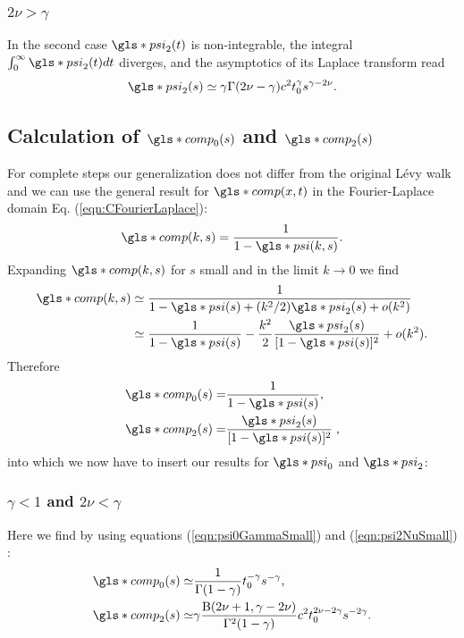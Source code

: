 \subsubsection*{$2\nu>\gamma$} 
In the second case $\gls*{psi}_2(t)$ is non-integrable, the integral $\int_0^\infty \gls*{psi}_2(t) dt$ diverges, and the asymptotics of its Laplace transform read
\begin{align}
 \gls*{psi}_2(s) \simeq \gamma \Gamma(2\nu-\gamma) c^2  t_0^\gamma s^{\gamma-2\nu}. \label{eqn:psi2NuBig}
\end{align}

\subsection*{Calculation of $\gls*{comp}_0(s)$ and $\gls*{comp}_2(s)$}

For complete steps our generalization does not differ from the original L\'evy walk and we can use the general result for $\gls*{comp}(x,t)$ in the Fourier-Laplace domain Eq. (\ref{eqn:CFourierLaplace}):
%
\begin{align}
\gls*{comp}(k,s) = \frac{1}{1 - \gls*{psi}(k,s)}.
\end{align}
%
Expanding $\gls*{comp}(k,s)$ for $s$ small and in the limit $k \to 0$ we find 
%
\begin{align}
\begin{split}
\gls*{comp}(k,s)  &\simeq \frac{1}{1 - \gls*{psi}(s) + (k^2/2) \gls*{psi}_2(s) +o(k^2)}\\ &\simeq \frac{1}{1-\gls*{psi}(s)} - \frac{k^2}{2}  \frac{\gls*{psi}_2(s)}{[1-\gls*{psi}(s)]^2} + o(k^2).
\end{split}
\end{align}
Therefore 
\begin{align}
\gls*{comp}_0(s) =& \frac{1}{1-\gls*{psi}(s)} , \\
\gls*{comp}_2(s) =& \frac{\gls*{psi}_2(s)}{[1-\gls*{psi}(s)]^2} \;,
\end{align}
into which we now have to insert our results for $\gls*{psi}_0$ and $\gls*{psi}_2$:

\subsubsection{$\gamma<1$ and $2\nu<\gamma$ }
Here we find by using equations (\ref{eqn:psi0GammaSmall}) and (\ref{eqn:psi2NuSmall}) :
\begin{align}
 \gls*{comp}_0(s) \simeq & \frac{1}{\Gamma(1-\gamma)} t_0^{-\gamma} s^{-\gamma}, \label{eq:Co}\\
 \gls*{comp}_2(s) \simeq & \gamma   \frac{ \mathrm{B}(2\nu+1,\gamma-2\nu)}{\Gamma^2(1-\gamma)} c^2 t_0^{2\nu - 2\gamma} s^{-2 \gamma} .
\end{align}

